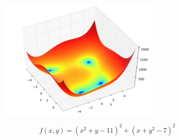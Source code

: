 \documentclass[a4paper,10pt]{article}
\begin{document}
\begin{figure}[H]
	\centering
	\includegraphics[width = 8cm]{img/himmelblau.png}
\end{figure}

$$
f(x,y) = (x^2 + y - 11)^2 + (x + y^2 - 7)^2
$$



\begin{figure}[h!]
	\centering
\end{figure}
\end{document}
